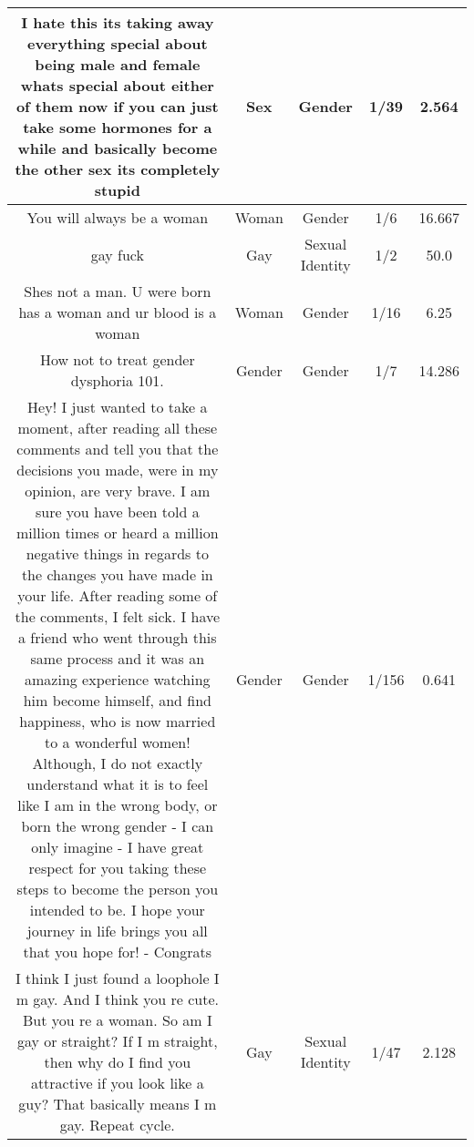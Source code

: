 \documentclass[11pt]{article}
\newlength\mylength
\begin{document}
\begin{center}
\begin{longtable}{|C{.40\mylength}|C{.30\mylength}|C{.15\mylength}|C{.15\mylength}|C{.15\mylength}|}
  I hate this its taking away everything special about being male and female whats special about either of them now if you can just take some hormones for a while and basically become the other sex its completely stupid  & Sex & Gender & 1/39 & 2.564 \\  \hline
  You will always be a woman  & Woman & Gender & 1/6 & 16.667 \\  \hline
  gay fuck  & Gay & Sexual Identity & 1/2 & 50.0 \\  \hline
  Shes not a man. U were born has a woman  and ur blood is a woman  & Woman & Gender & 1/16 & 6.25 \\  \hline
  How not to treat gender dysphoria 101.  & Gender & Gender & 1/7 & 14.286 \\  \hline
  Hey! I just wanted to take a moment, after reading all these comments and tell you that the decisions you made, were in my opinion, are very brave. I am sure you have been told a million times or heard a million negative things in regards to the changes you have made in your life. After reading some of the comments, I felt sick.  I have a friend who went through this same process and it was an amazing experience watching him become himself, and find happiness, who is now married to a wonderful women! Although, I do not exactly understand what it is to feel like I am in the wrong body, or born the wrong gender - I can only imagine - I have great respect for you taking these steps to become the person you intended to be. I hope your journey in life brings you all that you hope for! - Congrats  & Gender & Gender & 1/156 & 0.641 \\  \hline
  I think I just found a loophole  I m gay. And I think you re cute. But you re a woman. So am I gay or straight?  If I m straight, then why do I find you attractive if you look like a guy? That basically means I m gay. Repeat cycle.  & Gay & Sexual Identity & 1/47 & 2.128 \\  \hline

\end{longtable}
\end{center}
\end{document}
